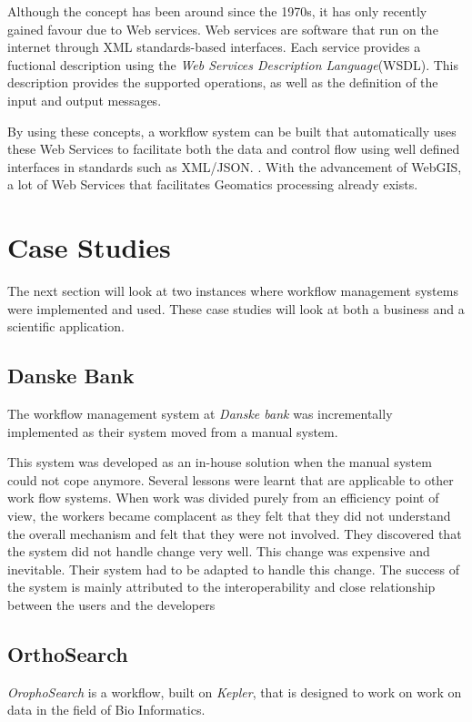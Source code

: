 \documentclass[12pt,a4paper]{report}
\begin{document}
Although the concept has been around since the 1970s, it has only recently
gained favour due to Web services.  Web services are software that run on the
internet through XML standards-based
interfaces\cite{Tai:2004:CCW:1045658.1045680}.  Each service provides a
fuctional description using the \emph{Web Services Description Language}(WSDL).
This description provides the supported operations, as well as the definition
of the input and output messages.

By using these concepts, a workflow system can be built that automatically uses
these Web Services to facilitate both the data and control flow using well
defined interfaces in standards such as XML/JSON.
\cite{Shegalov:2001:XWM:767132.767139}. With the advancement of WebGIS, a lot
of Web Services that facilitates Geomatics processing already exists.


\section{Case Studies}
The next section will look at two instances where workflow management systems
were implemented and used.  These case studies will look at both a business and
a scientific application.
    \subsection*{Danske Bank}
      The workflow management system at \emph{Danske bank} was incrementally
      implemented as their system moved from a manual
      system\cite{Brahe:2007:SWW:1316624.1316661}.

      This system was developed as an in-house solution when the manual system
      could not cope anymore.  Several lessons were learnt that are applicable
      to other work flow systems. When work was divided purely from an
      efficiency point of view, the workers became complacent as they felt that
      they did not understand the overall mechanism and felt that they were not
      involved. They discovered that the system did not handle change very
      well. This change was expensive and inevitable. Their system had to be
      adapted to handle this change. The success of the system is mainly
      attributed to the interoperability and close relationship between the
      users and the developers

    \subsection*{OrthoSearch}
      \emph{OrophoSearch} is a workflow, built on \emph{Kepler}, that is
      designed to work on work on data in the field of Bio Informatics.
      \cite{daCruz:2008:OSW:1363686.1363983}
\end{document}

